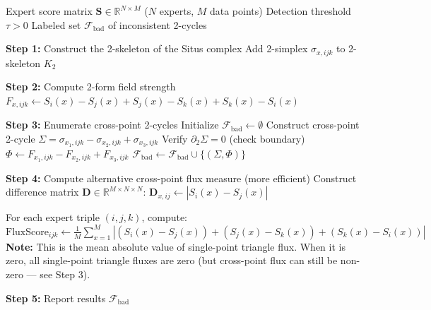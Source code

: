 \documentclass[12pt,a4paper]{article}
\theoremstyle{plain}
\theoremstyle{definition}
\theoremstyle{remark}
\newcommand{\R}{\mathbb{R}}
\newcommand{\bd}{\partial}
\begin{document}
\begin{algorithm}[h]
\caption{Audit Flux Detection Algorithm}
\label{alg:flux_detect}
\begin{algorithmic}[1]
\Require Expert score matrix $\mathbf{S} \in \R^{N \times M}$ ($N$ experts, $M$ data points)
\Require Detection threshold $\tau > 0$
\Ensure Labeled set $\mathcal{F}_{\mathrm{bad}}$ of inconsistent 2-cycles

\State \textbf{Step 1:} Construct the 2-skeleton of the Situs complex
        \State Add 2-simplex $\sigma_{x,ijk}$ to 2-skeleton $K_2$
    \EndFor
\EndFor

\State \textbf{Step 2:} Compute 2-form field strength
    \State $F_{x,ijk} \gets S_i(x) - S_j(x) + S_j(x) - S_k(x) + S_k(x) - S_i(x)$
\EndFor

\State \textbf{Step 3:} Enumerate cross-point 2-cycles
\State Initialize $\mathcal{F}_{\mathrm{bad}} \gets \emptyset$
        \State Construct cross-point 2-cycle $\Sigma = \sigma_{x_1,ijk} - \sigma_{x_2,ijk} + \sigma_{x_3,ijk}$
        \State Verify $\bd_2 \Sigma = 0$ (check boundary)
        \If{$\bd_2 \Sigma = 0$}
            \State $\Phi \gets F_{x_1,ijk} - F_{x_2,ijk} + F_{x_3,ijk}$
            \If{$|\Phi| > \tau$}
                \State $\mathcal{F}_{\mathrm{bad}} \gets \mathcal{F}_{\mathrm{bad}} \cup \{(\Sigma, \Phi)\}$
            \EndIf
        \EndIf
    \EndFor
\EndFor

\State \textbf{Step 4:} Compute alternative cross-point flux measure (more efficient)
\State Construct difference matrix $\mathbf{D} \in \R^{M \times N \times N}$:
        \State $\mathbf{D}_{x,ij} \gets |S_i(x) - S_j(x)|$
    \EndFor
\EndFor

\State For each expert triple $(i,j,k)$, compute:
\State $\mathrm{FluxScore}_{ijk} \gets \frac{1}{M}\sum_{x=1}^M \left|(S_i(x) - S_j(x)) + (S_j(x) - S_k(x)) + (S_k(x) - S_i(x))\right|$
\State \textbf{Note:} This is the mean absolute value of single-point triangle flux. When it is zero, all single-point triangle fluxes are zero (but cross-point flux can still be non-zero --- see Step 3).

\State \textbf{Step 5:} Report results
\State \Return $\mathcal{F}_{\mathrm{bad}}$
\end{algorithmic}
\end{algorithm}
\end{document}
